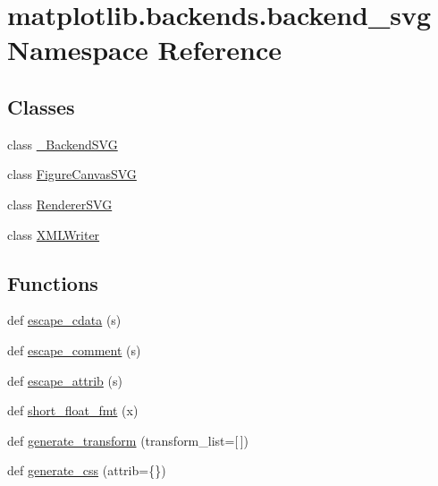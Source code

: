 \hypertarget{namespacematplotlib_1_1backends_1_1backend__svg}{}\section{matplotlib.\+backends.\+backend\+\_\+svg Namespace Reference}
\label{namespacematplotlib_1_1backends_1_1backend__svg}
\subsection*{Classes}
\begin{DoxyCompactItemize}
\item 
class \hyperlink{classmatplotlib_1_1backends_1_1backend__svg_1_1__BackendSVG}{\+\_\+\+Backend\+S\+VG}
\item 
class \hyperlink{classmatplotlib_1_1backends_1_1backend__svg_1_1FigureCanvasSVG}{Figure\+Canvas\+S\+VG}
\item 
class \hyperlink{classmatplotlib_1_1backends_1_1backend__svg_1_1RendererSVG}{Renderer\+S\+VG}
\item 
class \hyperlink{classmatplotlib_1_1backends_1_1backend__svg_1_1XMLWriter}{X\+M\+L\+Writer}
\end{DoxyCompactItemize}
\subsection*{Functions}
\begin{DoxyCompactItemize}
\item 
def \hyperlink{namespacematplotlib_1_1backends_1_1backend__svg_a6280b9047584bd905479669cf7cfc628}{escape\+\_\+cdata} (s)
\item 
def \hyperlink{namespacematplotlib_1_1backends_1_1backend__svg_a885133047d5ba96cf924af0f867b951b}{escape\+\_\+comment} (s)
\item 
def \hyperlink{namespacematplotlib_1_1backends_1_1backend__svg_a19990fd3c55db179aebbcb7952adb4b3}{escape\+\_\+attrib} (s)
\item 
def \hyperlink{namespacematplotlib_1_1backends_1_1backend__svg_aa060a39dc60eb0a110aa88fbe46b5760}{short\+\_\+float\+\_\+fmt} (x)
\item 
def \hyperlink{namespacematplotlib_1_1backends_1_1backend__svg_a9ca8b0e8aac255419c6691f8a00988f3}{generate\+\_\+transform} (transform\+\_\+list=\mbox{[}$\,$\mbox{]})
\item 
def \hyperlink{namespacematplotlib_1_1backends_1_1backend__svg_a589ec5da5598cca617a987a55c645faf}{generate\+\_\+css} (attrib=\{\})
\end{DoxyCompactItemize}
